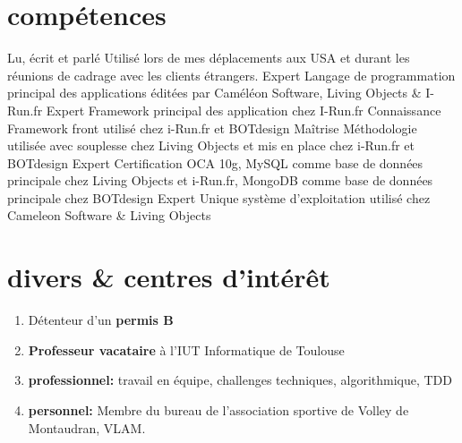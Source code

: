 \documentclass{friggeri-cv} 	%
\begin{document}

\section{compétences}
\vspace{-0.4cm}
\begin{capabilitize}
		{Lu, écrit et parlé}
		{Utilisé lors de mes déplacements aux USA et durant les réunions de cadrage avec les clients
		étrangers.}
		{Expert}
		{Langage de programmation principal des applications éditées par Caméléon Software, Living Objects \& I-Run.fr}
		{Expert}
		{Framework principal des application chez I-Run.fr}
		{Connaissance}
		{Framework front utilisé chez i-Run.fr et BOTdesign}
		{Maîtrise}
		{Méthodologie utilisée avec souplesse chez Living Objects et mis en place chez i-Run.fr et BOTdesign}
		{Expert}
		{Certification OCA 10g, MySQL comme base de données principale chez Living Objects et i-Run.fr, MongoDB comme base de données principale chez BOTdesign}
		{Expert}
		{Unique système d’exploitation utilisé chez Cameleon Software \& Living Objects}
\end{capabilitize}


\section{divers \& centres d’intérêt}
\vspace{-0.4cm}
\begin{enumerate}
    \item Détenteur d’un \textbf{permis B}
    \item \textbf{Professeur vacataire} à l’IUT Informatique de Toulouse
    \item \textbf{professionnel:} travail en équipe, challenges techniques, algorithmique, TDD
    \item \textbf{personnel:} Membre du bureau de l’association sportive de Volley de Montaudran, VLAM.
\end{enumerate}
\end{document}
